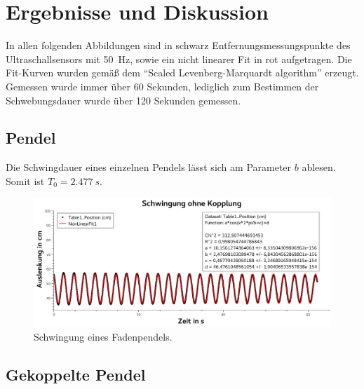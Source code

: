 \documentclass[
	a4paper,
	12pt,
	pagesize,
	ngerman
]{scrartcl}
\begin{document}
	\section{Ergebnisse und Diskussion}
	In allen folgenden Abbildungen sind in schwarz Entfernungsmessungspunkte des Ultraschallsensors mit \SI{50}{Hz}, sowie ein nicht linearer Fit in rot aufgetragen.  Die Fit-Kurven wurden gemäß dem \enquote{Scaled Levenberg-Marquardt algorithm} erzeugt. Gemessen wurde immer über \SI{60}{} Sekunden, lediglich zum Bestimmen der Schwebungsdauer wurde über \SI{120}{} Sekunden gemessen.
	\subsection{Pendel}
	Die Schwingdauer eines einzelnen Pendels lässt sich am Parameter $b$ ablesen. Somit ist $T_0 =  \SI{2,477}{s}$.

	\begin{figure}[H]
		\includegraphics[width=1\textwidth]{SchwingungOhneKopplung}
		\centering
		\caption{Schwingung eines Fadenpendels.}
		\label{SchwingungOhneKopplung}
		\centering
	\end{figure}

	\subsection{Gekoppelte Pendel}
\end{document}
